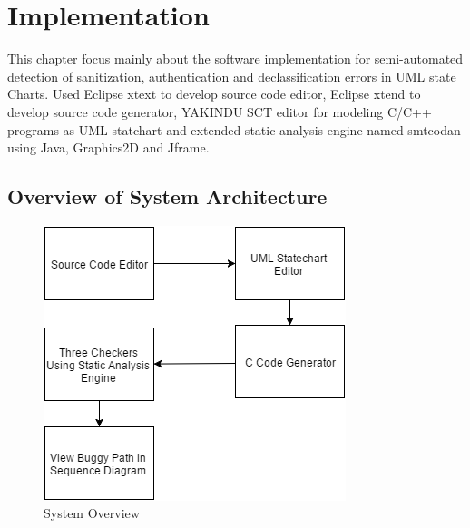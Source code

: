\chapter{Implementation}
This chapter focus mainly about the software implementation for semi-automated detection of sanitization, authentication and declassification errors in UML state Charts. Used Eclipse xtext to develop source code editor, Eclipse xtend to develop source code generator, YAKINDU SCT editor for modeling C/C++ programs as UML statchart and extended static analysis engine named smtcodan using Java, Graphics2D and Jframe. 

\section{Overview of System Architecture}

\begin{figure}[htbp]
	\centering
	\includegraphics{styles/system_architecture.png}
	\caption{System Overview}
\end{figure}

